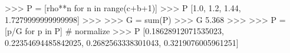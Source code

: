 
>>> P = [rho**n for n in range(c+b+1)]
>>> P
[1.0, 1.2, 1.44, 1.7279999999999998]
>>>
>>> G = sum(P)
>>> G
5.368
>>>
>>> P = [p/G for p in P] # normalize
>>> P
[0.18628912071535023, 0.22354694485842025, 0.2682563338301043,
0.3219076005961251]

